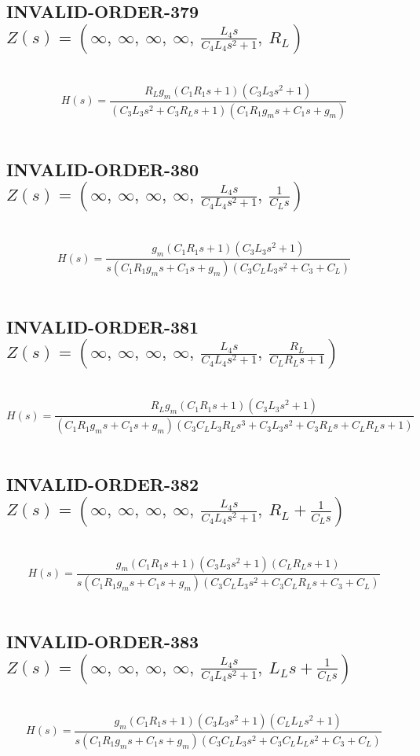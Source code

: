 \documentclass{article}
\begin{document}
\subsection{INVALID-ORDER-379 $Z(s) = \left( \infty, \  \infty, \  \infty, \  \infty, \  \frac{L_{4} s}{C_{4} L_{4} s^{2} + 1}, \  R_{L}\right)$ } \ 
\textbf{\[H(s) = \frac{R_{L} g_{m} \left(C_{1} R_{1} s + 1\right) \left(C_{3} L_{3} s^{2} + 1\right)}{\left(C_{3} L_{3} s^{2} + C_{3} R_{L} s + 1\right) \left(C_{1} R_{1} g_{m} s + C_{1} s + g_{m}\right)}\] } \ 
\subsection{INVALID-ORDER-380 $Z(s) = \left( \infty, \  \infty, \  \infty, \  \infty, \  \frac{L_{4} s}{C_{4} L_{4} s^{2} + 1}, \  \frac{1}{C_{L} s}\right)$ } \ 
\textbf{\[H(s) = \frac{g_{m} \left(C_{1} R_{1} s + 1\right) \left(C_{3} L_{3} s^{2} + 1\right)}{s \left(C_{1} R_{1} g_{m} s + C_{1} s + g_{m}\right) \left(C_{3} C_{L} L_{3} s^{2} + C_{3} + C_{L}\right)}\] } \ 
\subsection{INVALID-ORDER-381 $Z(s) = \left( \infty, \  \infty, \  \infty, \  \infty, \  \frac{L_{4} s}{C_{4} L_{4} s^{2} + 1}, \  \frac{R_{L}}{C_{L} R_{L} s + 1}\right)$ } \ 
\textbf{\[H(s) = \frac{R_{L} g_{m} \left(C_{1} R_{1} s + 1\right) \left(C_{3} L_{3} s^{2} + 1\right)}{\left(C_{1} R_{1} g_{m} s + C_{1} s + g_{m}\right) \left(C_{3} C_{L} L_{3} R_{L} s^{3} + C_{3} L_{3} s^{2} + C_{3} R_{L} s + C_{L} R_{L} s + 1\right)}\] } \ 
\subsection{INVALID-ORDER-382 $Z(s) = \left( \infty, \  \infty, \  \infty, \  \infty, \  \frac{L_{4} s}{C_{4} L_{4} s^{2} + 1}, \  R_{L} + \frac{1}{C_{L} s}\right)$ } \ 
\textbf{\[H(s) = \frac{g_{m} \left(C_{1} R_{1} s + 1\right) \left(C_{3} L_{3} s^{2} + 1\right) \left(C_{L} R_{L} s + 1\right)}{s \left(C_{1} R_{1} g_{m} s + C_{1} s + g_{m}\right) \left(C_{3} C_{L} L_{3} s^{2} + C_{3} C_{L} R_{L} s + C_{3} + C_{L}\right)}\] } \ 
\subsection{INVALID-ORDER-383 $Z(s) = \left( \infty, \  \infty, \  \infty, \  \infty, \  \frac{L_{4} s}{C_{4} L_{4} s^{2} + 1}, \  L_{L} s + \frac{1}{C_{L} s}\right)$ } \ 
\textbf{\[H(s) = \frac{g_{m} \left(C_{1} R_{1} s + 1\right) \left(C_{3} L_{3} s^{2} + 1\right) \left(C_{L} L_{L} s^{2} + 1\right)}{s \left(C_{1} R_{1} g_{m} s + C_{1} s + g_{m}\right) \left(C_{3} C_{L} L_{3} s^{2} + C_{3} C_{L} L_{L} s^{2} + C_{3} + C_{L}\right)}\] } \ 
\end{document}
